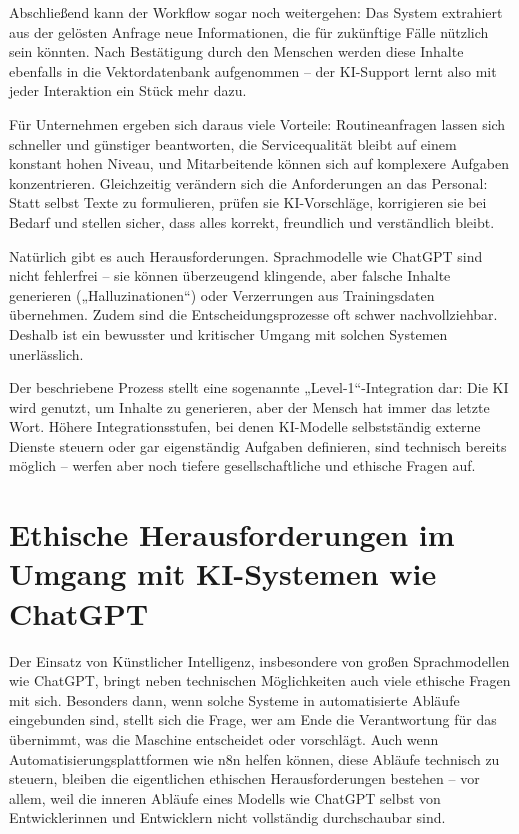 \documentclass[utf8,biblatex]{bremerhaven_lni}
\begin{document}
Abschließend kann der Workflow sogar noch weitergehen: Das System extrahiert aus der gelösten Anfrage neue Informationen, die für zukünftige Fälle nützlich sein könnten. Nach Bestätigung durch den Menschen werden diese Inhalte ebenfalls in die Vektordatenbank aufgenommen – der KI-Support lernt also mit jeder Interaktion ein Stück mehr dazu.

Für Unternehmen ergeben sich daraus viele Vorteile: Routineanfragen lassen sich schneller und günstiger beantworten, die Servicequalität bleibt auf einem konstant hohen Niveau, und Mitarbeitende können sich auf komplexere Aufgaben konzentrieren. Gleichzeitig verändern sich die Anforderungen an das Personal: Statt selbst Texte zu formulieren, prüfen sie KI-Vorschläge, korrigieren sie bei Bedarf und stellen sicher, dass alles korrekt, freundlich und verständlich bleibt.

Natürlich gibt es auch Herausforderungen. Sprachmodelle wie ChatGPT sind nicht fehlerfrei – sie können überzeugend klingende, aber falsche Inhalte generieren („Halluzinationen“) oder Verzerrungen aus Trainingsdaten übernehmen. Zudem sind die Entscheidungsprozesse oft schwer nachvollziehbar. Deshalb ist ein bewusster und kritischer Umgang mit solchen Systemen unerlässlich.

Der beschriebene Prozess stellt eine sogenannte „Level-1“-Integration dar: Die KI wird genutzt, um Inhalte zu generieren, aber der Mensch hat immer das letzte Wort. Höhere Integrationsstufen, bei denen KI-Modelle selbstständig externe Dienste steuern oder gar eigenständig Aufgaben definieren, sind technisch bereits möglich – werfen aber noch tiefere gesellschaftliche und ethische Fragen auf.




\section{Ethische Herausforderungen im Umgang mit KI-Systemen wie ChatGPT}
Der Einsatz von Künstlicher Intelligenz, insbesondere von großen Sprachmodellen wie ChatGPT, bringt neben technischen Möglichkeiten auch viele ethische Fragen mit sich. Besonders dann, wenn solche Systeme in automatisierte Abläufe eingebunden sind, stellt sich die Frage, wer am Ende die Verantwortung für das übernimmt, was die Maschine entscheidet oder vorschlägt. Auch wenn Automatisierungsplattformen wie n8n helfen können, diese Abläufe technisch zu steuern, bleiben die eigentlichen ethischen Herausforderungen bestehen – vor allem, weil die inneren Abläufe eines Modells wie ChatGPT selbst von Entwicklerinnen und Entwicklern nicht vollständig durchschaubar sind.
\end{document}

